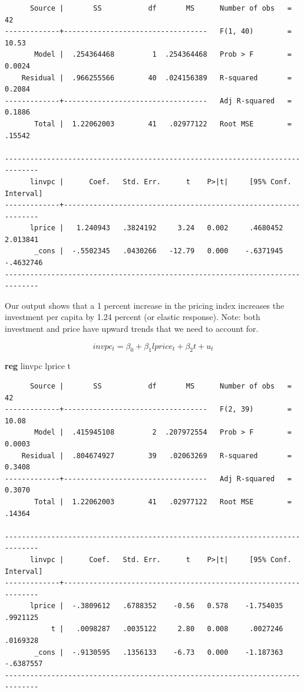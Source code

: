 \documentclass[
]{book}
\newenvironment{Shaded}{\begin{snugshade}}{\end{snugshade}}
\newcommand{\KeywordTok}[1]{\textcolor[rgb]{0.13,0.29,0.53}{\textbf{#1}}}
\newcommand{\NormalTok}[1]{#1}
\begin{document}
\begin{verbatim}
      Source |       SS           df       MS      Number of obs   =        42
-------------+----------------------------------   F(1, 40)        =     10.53
       Model |  .254364468         1  .254364468   Prob > F        =    0.0024
    Residual |  .966255566        40  .024156389   R-squared       =    0.2084
-------------+----------------------------------   Adj R-squared   =    0.1886
       Total |  1.22062003        41   .02977122   Root MSE        =    .15542

------------------------------------------------------------------------------
      linvpc |      Coef.   Std. Err.      t    P>|t|     [95% Conf. Interval]
-------------+----------------------------------------------------------------
      lprice |   1.240943   .3824192     3.24   0.002     .4680452    2.013841
       _cons |  -.5502345   .0430266   -12.79   0.000    -.6371945   -.4632746
------------------------------------------------------------------------------
\end{verbatim}

Our output shows that a 1 percent increase in the pricing index increases
the investment per capita by 1.24 percent (or elastic response).
Note: both investment and price have upward trends that we need to account for.

\[ invpc_t = \beta_0 + \beta_1 lprice_t + \beta_2 t + u_t \]

\begin{Shaded}
\begin{Highlighting}[]
\KeywordTok{reg}\NormalTok{ linvpc lprice t}
\end{Highlighting}
\end{Shaded}

\begin{verbatim}
      Source |       SS           df       MS      Number of obs   =        42
-------------+----------------------------------   F(2, 39)        =     10.08
       Model |  .415945108         2  .207972554   Prob > F        =    0.0003
    Residual |  .804674927        39   .02063269   R-squared       =    0.3408
-------------+----------------------------------   Adj R-squared   =    0.3070
       Total |  1.22062003        41   .02977122   Root MSE        =    .14364

------------------------------------------------------------------------------
      linvpc |      Coef.   Std. Err.      t    P>|t|     [95% Conf. Interval]
-------------+----------------------------------------------------------------
      lprice |  -.3809612   .6788352    -0.56   0.578    -1.754035    .9921125
           t |   .0098287   .0035122     2.80   0.008     .0027246    .0169328
       _cons |  -.9130595   .1356133    -6.73   0.000    -1.187363   -.6387557
------------------------------------------------------------------------------
\end{verbatim}
\end{document}
